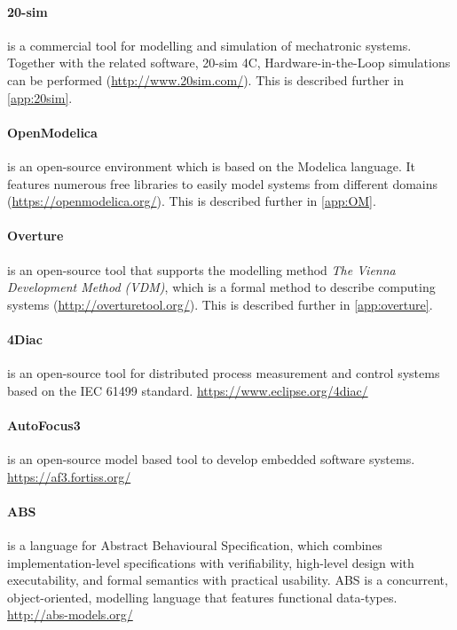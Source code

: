 \paragraph{20-sim} is a commercial tool for modelling and simulation of mechatronic systems. Together with the related software, 20-sim 4C, Hardware-in-the-Loop simulations can be performed (\url{http://www.20sim.com/}). This is described further in \autoref{app:20sim}.

\paragraph{OpenModelica} is an open-source environment which is based on the Modelica language. It features numerous free libraries to easily model systems from different domains (\url{https://openmodelica.org/}). This is described further in \autoref{app:OM}.

\paragraph{Overture} is an open-source tool that supports the modelling method \textit{The Vienna Development Method (VDM)}, which is a formal method to describe computing systems (\url{http://overturetool.org/}). This is described further in \autoref{app:overture}.

\paragraph{4Diac} is an open-source tool for distributed process measurement and control systems based on the IEC 61499 standard. \url{https://www.eclipse.org/4diac/}

\paragraph{AutoFocus3} is an open-source model based tool to develop embedded software systems. \url{https://af3.fortiss.org/}


\paragraph{ABS} is a language for Abstract Behavioural Specification, which combines implementation-level specifications with verifiability, high-level design with executability, and formal semantics with practical usability. ABS is a concurrent, object-oriented, modelling language that features functional data-types. \url{http://abs-models.org/}

